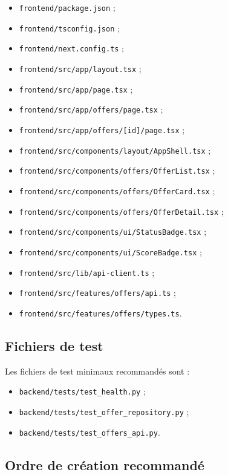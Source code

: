 \documentclass[11pt,a4paper]{article}
\begin{document}
\begin{itemize}
    \item \texttt{frontend/package.json} ;
    \item \texttt{frontend/tsconfig.json} ;
    \item \texttt{frontend/next.config.ts} ;
    \item \texttt{frontend/src/app/layout.tsx} ;
    \item \texttt{frontend/src/app/page.tsx} ;
    \item \texttt{frontend/src/app/offers/page.tsx} ;
    \item \texttt{frontend/src/app/offers/[id]/page.tsx} ;
    \item \texttt{frontend/src/components/layout/AppShell.tsx} ;
    \item \texttt{frontend/src/components/offers/OfferList.tsx} ;
    \item \texttt{frontend/src/components/offers/OfferCard.tsx} ;
    \item \texttt{frontend/src/components/offers/OfferDetail.tsx} ;
    \item \texttt{frontend/src/components/ui/StatusBadge.tsx} ;
    \item \texttt{frontend/src/components/ui/ScoreBadge.tsx} ;
    \item \texttt{frontend/src/lib/api-client.ts} ;
    \item \texttt{frontend/src/features/offers/api.ts} ;
    \item \texttt{frontend/src/features/offers/types.ts}.
\end{itemize}

\subsection{Fichiers de test}

Les fichiers de test minimaux recommandés sont :

\begin{itemize}
    \item \texttt{backend/tests/test\_health.py} ;
    \item \texttt{backend/tests/test\_offer\_repository.py} ;
    \item \texttt{backend/tests/test\_offers\_api.py}.
\end{itemize}

\subsection{Ordre de création recommandé}
\end{document}
